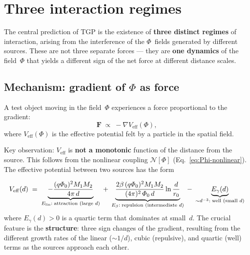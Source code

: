 \section{Three interaction regimes}\label{sec:rezimy}

The central prediction of TGP is the existence of \textbf{three
distinct regimes} of interaction, arising from the interference of the
$\Phi$~fields generated by different sources.  These are not three
separate forces --- they are \textbf{one dynamics} of the field~$\Phi$
that yields a different sign of the net force at different distance
scales.

\subsection{Mechanism: gradient of $\Phi$ as force}\label{ssec:mechanizm}

A test object moving in the field~$\Phi$ experiences a force
proportional to the gradient:
\begin{equation}\label{eq:force}
    \mathbf{F} \;\propto\; -\nabla V_{\mathrm{eff}}(\Phi),
\end{equation}
where $V_{\mathrm{eff}}(\Phi)$ is the effective potential felt by a
particle in the spatial field.

Key observation: $V_{\mathrm{eff}}$ is \textbf{not a monotonic}
function of the distance from the source.  This follows from the
nonlinear coupling $\mathcal{N}[\Phi]$
(Eq.~\ref{eq:Phi-nonlinear}).  The effective potential between two
sources has the form

\begin{equation}\label{eq:Veff-profile}
    V_{\mathrm{eff}}(d) \;=\;
    \underbrace{-\frac{(q\PhiZero)^2 M_1 M_2}{4\pi\,d}}_{%
      E_{\mathrm{lin}}:\;\text{attraction (large }d\text{)}}
    \;+\;
    \underbrace{\frac{2\beta\,(q\PhiZero)^2 M_1 M_2}
      {(4\pi)^2\,\PhiZero\,d}\ln\frac{d}{r_0}}_{%
      E_\beta:\;\text{repulsion (intermediate }d\text{)}}
    \;-\;
    \underbrace{E_\gamma(d)}_{%
      \sim d^{-3}:\;\text{well (small }d\text{)}}
\end{equation}
where $E_\gamma(d) > 0$ is a quartic term that dominates at
small~$d$.  The crucial feature is the \textbf{structure}: three
sign changes of the gradient, resulting from the different growth
rates of the linear ($\sim 1/d$), cubic (repulsive), and quartic
(well) terms as the sources approach each other.

